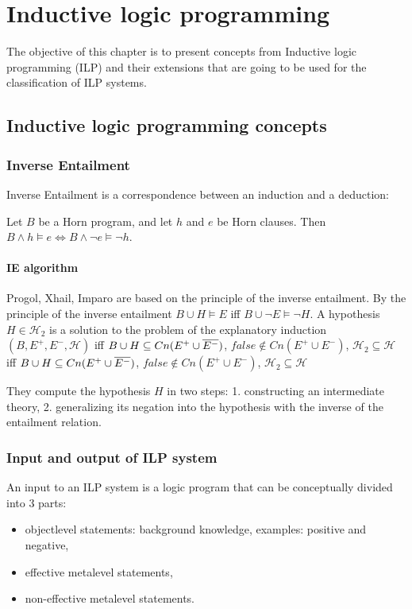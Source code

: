 \chapter{Inductive logic programming}
The objective of this chapter is to present concepts from Inductive logic programming (ILP) and their extensions that are going to be used for the classification of ILP systems.

\section{Inductive logic programming concepts}

\subsection{Inverse Entailment}
Inverse Entailment is a correspondence between an induction and a deduction:
\begin{thm}\cite{kimber2012learning}
Let $B$ be a Horn program, and let $h$ and $e$ be
Horn clauses. Then $B \wedge h \models e \iff B \wedge \neg e \models \neg h$.
\end{thm}

\subsubsection{IE algorithm\cite{yamamoto2012inverse}}\label{inverse_entailement_algorithm}
Progol, Xhail, Imparo are based on the principle of the inverse entailment. By the principle of the inverse entailment $B \cup H \models E$ iff
$B \cup \neg E \models \neg H$. A hypothesis $H \in \mathcal{H}_2$ is a solution to the problem of the explanatory induction $(B,E^{+},E^{-},\mathcal{H})$ iff
$B \cup H \subseteq Cn(E^{+} \cup \overline{E^{-}})$,
 $false \not\in Cn(E^{+} \cup E^{-})$, $\mathcal{H}_2 \subseteq \mathcal{H}$
iff
$B \cup H \subseteq Cn(E^{+} \cup \overline{E^{-}})$,
 $false \not\in Cn(E^{+} \cup E^{-})$, $\mathcal{H}_2 \subseteq \mathcal{H}$
 
They compute the hypothesis $H$ in two steps:
1. constructing an intermediate theory, 2. generalizing its negation into the hypothesis with the inverse of the entailment relation.

\subsection{Input and output of ILP system}
An input to an ILP system is a logic program that can be conceptually divided into 3 parts:
\begin{itemize}
\item objectlevel statements: background knowledge, examples: positive and negative,
\item effective metalevel statements,
\item non-effective metalevel statements.
\end{itemize}

